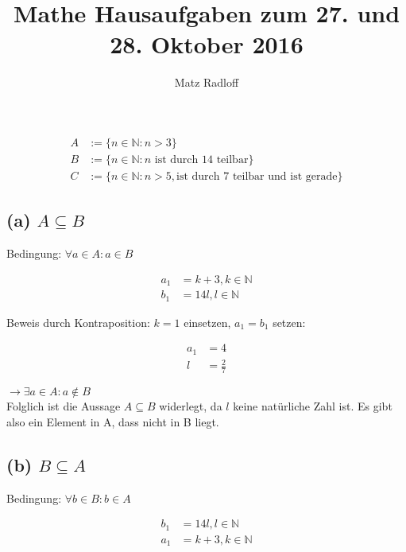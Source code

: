 \documentclass[11pt,a4paper]{article}
\title{\textbf{Mathe Hausaufgaben zum 27. und 28. Oktober 2016}}
\author{Matz Radloff}
\begin{document}
  \maketitle
  \date{}
  \tableofcontents
  \newpage

\section{}

\begin{align}
A &:= \{n \in \mathbb{N} : n > 3\}\\
B &:= \{n \in \mathbb{N} : n \mbox{ ist durch 14 teilbar}\}\\
C &:= \{n \in \mathbb{N} : n > 5, \mbox{ist durch 7 teilbar und ist gerade}\}
\end{align}

\subsection[(a)]{(a) $A \subseteq B$}

Bedingung: $\forall a \in A : a \in B$

\begin{align}
a_{1} &= k+3, k \in \mathbb{N}\\
b_{1} &= 14l, l \in \mathbb{N}
\end{align}

Beweis durch Kontraposition: $k=1$ einsetzen, $a_{1} = b_{1}$ setzen:

\begin{align}
a_{1} &= 4\\
l &= \frac{2}{7}
\end{align}

$\rightarrow \exists a \in A : a \notin B$\\
Folglich ist die Aussage $A \subseteq B$ widerlegt, da $l$ keine natürliche Zahl ist. Es gibt also ein Element in A, dass nicht in B liegt.

\subsection[(b)]{(b) $B \subseteq A$}

Bedingung: $\forall b \in B : b \in A$

\begin{align}
b_{1} &= 14l, l \in \mathbb{N}\\
a_{1} &= k+3, k \in \mathbb{N}
\end{align}
\end{document}
